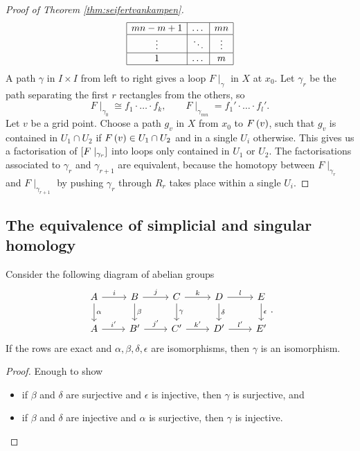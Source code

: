 \begin{proof}[Proof of Theorem \ref{thm:seifertvankampen}]
$$\begin{array}{|c|c|c|}
\hline
mn - m + 1 & \dots & mn \\
\hline
\vdots & \ddots & \vdots \\
\hline
1 & \dots & m \\
\hline
\end{array}
$$
A path $ \gamma $ in $ I \times I $ from left to right gives a loop $ F \mid_\gamma $ in $ X $ at $ x_0 $. Let $ \gamma_r $ be the path separating the first $ r $ rectangles from the others, so
$$ F \mid_{\gamma_0} \cong f_1 \cdot \dots \cdot f_k, \qquad F \mid_{\gamma_{mn}} = f_1' \cdot \dots \cdot f_l'. $$
Let $ v $ be a grid point. Choose a path $ g_v $ in $ X $ from $ x_0 $ to $ F\rb{v} $, such that $ g_v $ is contained in $ U_1 \cap U_2 $ if $ F\rb{v} \in U_1 \cap U_2 $ and in a single $ U_i $ otherwise. This gives us a factorisation of $ \sb{F \mid_{\gamma_r}} $ into loops only contained in $ U_1 $ or $ U_2 $. The factorisations associated to $ \gamma_r $ and $ \gamma_{r + 1} $ are equivalent, because the homotopy between $ F \mid_{\gamma_r} $ and $ F \mid_{\gamma_{r + 1}} $ by pushing $ \gamma_r $ through $ R_r $ takes place within a single $ U_i $.
\end{proof}

\pagebreak

\subsection{The equivalence of simplicial and singular homology}

\begin{lemma}
Consider the following diagram of abelian groups
$$
\begin{tikzcd}
A \arrow{r}{i} \arrow{d}{\alpha} & B \arrow{r}{j} \arrow{d}{\beta} & C \arrow{r}{k} \arrow{d}{\gamma} & D \arrow{r}{l} \arrow{d}{\delta} & E \arrow{d}{\epsilon} \\
A \arrow{r}{i'} & B' \arrow{r}{j'} & C' \arrow{r}{k'} & D' \arrow{r}{l'} & E'
\end{tikzcd}.
$$
If the rows are exact and $ \alpha, \beta, \delta, \epsilon $ are isomorphisms, then $ \gamma $ is an isomorphism.
\end{lemma}

\begin{proof}
Enough to show
\begin{itemize}
\item if $ \beta $ and $ \delta $ are surjective and $ \epsilon $ is injective, then $ \gamma $ is surjective, and
\item if $ \beta $ and $ \delta $ are injective and $ \alpha $ is surjective, then $ \gamma $ is injective.
\end{itemize}
\end{proof}

